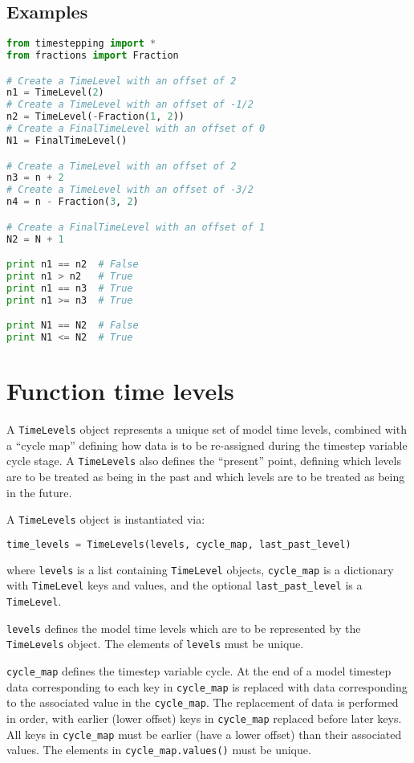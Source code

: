 \documentclass[a4paper]{book}
\begin{document}
\subsection*{Examples}
\begin{lstlisting}[language = python, frame = single, basicstyle=\footnotesize]
from timestepping import *
from fractions import Fraction

# Create a TimeLevel with an offset of 2
n1 = TimeLevel(2)
# Create a TimeLevel with an offset of -1/2
n2 = TimeLevel(-Fraction(1, 2))
# Create a FinalTimeLevel with an offset of 0
N1 = FinalTimeLevel()

# Create a TimeLevel with an offset of 2
n3 = n + 2
# Create a TimeLevel with an offset of -3/2
n4 = n - Fraction(3, 2)

# Create a FinalTimeLevel with an offset of 1
N2 = N + 1

print n1 == n2  # False
print n1 > n2   # True
print n1 == n3  # True
print n1 >= n3  # True

print N1 == N2  # False
print N1 <= N2  # True
\end{lstlisting}

\section{Function time levels}

A \verb+TimeLevels+ object represents a unique set of model time levels,
combined with a ``cycle map'' defining how data is to be re-assigned during the
timestep variable cycle stage. A \verb+TimeLevels+ also defines the ``present''
point, defining which levels are to be treated as being in the past and which
levels are to be treated as being in the future.

A \verb+TimeLevels+ object is instantiated via:
\begin{lstlisting}[language = python, frame = single, basicstyle=\footnotesize]
time_levels = TimeLevels(levels, cycle_map, last_past_level)
\end{lstlisting}
where \verb+levels+ is a list containing \verb+TimeLevel+ objects,
\verb+cycle_map+ is a dictionary with \verb+TimeLevel+ keys and values, and the
optional \verb+last_past_level+ is a \verb+TimeLevel+.

\verb+levels+ defines the model time levels which are to be represented by the
\verb+TimeLevels+ object. The elements of \verb+levels+ must be unique.

\verb+cycle_map+ defines the timestep variable cycle. At the end of a model
timestep data corresponding to each key in \verb+cycle_map+ is replaced with
data corresponding to the associated value in the \verb+cycle_map+. The
replacement of data is performed in order, with earlier (lower offset) keys in
\verb+cycle_map+ replaced before later keys. All keys in \verb+cycle_map+ must
be earlier (have a lower offset) than their associated values. The elements in
\verb+cycle_map.values()+ must be unique.
\end{document}
